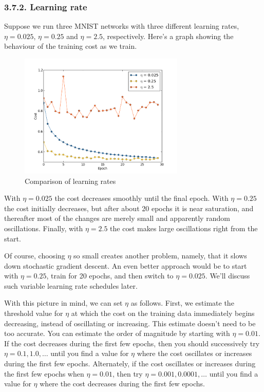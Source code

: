 \documentclass[12 pt]{article}
\begin{document}
\subsubsection{3.7.2. Learning rate}\label{learning-rate}

Suppose we run three MNIST networks with three different learning rates,
$ \eta = 0.025 $, $ \eta = 0.25 $ and $ \eta = 2.5 $, respectively.
Here's a graph showing the behaviour of the training cost as we train.

\begin{figure}[htp]
\centering
\includegraphics[width=0.7\textwidth]{./figs/multiple_eta.png}
\caption{Comparison of learning rates}
\end{figure}

With $ \eta = 0.025 $ the cost decreases smoothly until the final
epoch. With $ \eta = 0.25 $ the cost initially decreases, but after
about 20 epochs it is near saturation, and thereafter most of the
changes are merely small and apparently random oscillations. Finally,
with $ \eta = 2.5 $ the cost makes large oscillations right from the
start.

Of course, choosing $ \eta $ so small creates another problem, namely,
that it slows down stochastic gradient descent. An even better approach
would be to start with $ \eta = 0.25
$, train for 20 epochs, and then switch to $ \eta = 0.025 $. We'll
discuss such variable learning rate schedules later.

With this picture in mind, we can set $ \eta $ as follows. First, we
estimate the threshold value for $ \eta $ at which the cost on the
training data immediately begins decreasing, instead of oscillating or
increasing. This estimate doesn't need to be too accurate. You can
estimate the order of magnitude by starting with $ \eta = 0.01
$. If the cost decreases during the first few epochs, then you should successively try $
\eta = 0.1, 1.0, \ldots{} $ until you find a value for $ \eta $ where
the cost oscillates or increases during the first few epochs.
Alternately, if the cost oscillates or increases during the first few
epochs when $ \eta = 0.01 $, then try $ \eta = 0.001, 0.0001, \ldots{}
$ until you find a value for $ \eta $ where the cost decreases during
the first few epochs.
\end{document}
